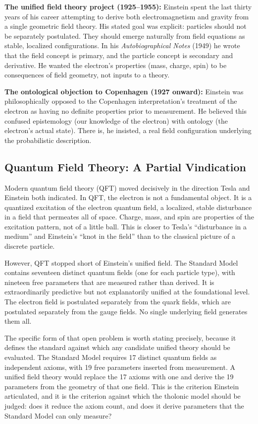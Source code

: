 \documentclass[12pt]{article}
\begin{document}
\textbf{The unified field theory project (1925--1955):} Einstein spent
the last thirty years of his career attempting to derive both
electromagnetism and gravity from a single geometric field theory. His
stated goal was explicit: particles should not be separately postulated.
They should emerge naturally from field equations as stable, localized
configurations. In his \emph{Autobiographical Notes} (1949) he wrote
that the field concept is primary, and the particle concept is secondary
and derivative. He wanted the electron's properties (mass, charge, spin)
to be consequences of field geometry, not inputs to a theory.

\textbf{The ontological objection to Copenhagen (1927 onward):} Einstein
was philosophically opposed to the Copenhagen interpretation's treatment
of the electron as having no definite properties prior to measurement.
He believed this confused epistemology (our knowledge of the electron)
with ontology (the electron's actual state). There is, he insisted, a
real field configuration underlying the probabilistic description.

\subsection{Quantum Field Theory: A Partial Vindication}\label{quantum-field-theory-a-partial-vindication}

Modern quantum field theory (QFT) moved decisively in the direction
Tesla and Einstein both indicated. In QFT, the electron is not a
fundamental object. It is a quantized excitation of the electron quantum
field, a localized, stable disturbance in a field that permeates all of
space. Charge, mass, and spin are properties of the excitation pattern,
not of a little ball. This is closer to Tesla's ``disturbance in a
medium'' and Einstein's ``knot in the field'' than to the classical
picture of a discrete particle.

However, QFT stopped short of Einstein's unified field. The Standard
Model contains seventeen distinct quantum fields (one for each particle
type), with nineteen free parameters that are measured rather than
derived. It is extraordinarily predictive but not explanatorily unified
at the foundational level. The electron field is postulated separately
from the quark fields, which are postulated separately from the gauge
fields. No single underlying field generates them all.

The specific form of that open problem is worth stating precisely,
because it defines the standard against which any candidate unified
theory should be evaluated. The Standard Model requires 17 distinct
quantum fields as independent axioms, with 19 free parameters inserted
from measurement. A unified field theory would replace the 17 axioms
with one and derive the 19 parameters from the geometry of that one
field. This is the criterion Einstein articulated, and it is the
criterion against which the tholonic model should be judged: does it
reduce the axiom count, and does it derive parameters that the Standard
Model can only measure?
\end{document}

